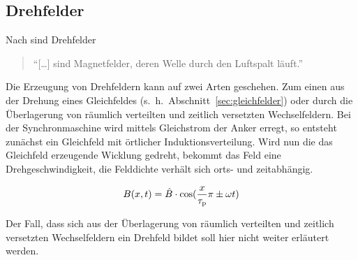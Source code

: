 \subsection{Drehfelder}\label{sec:drehfelder}

Nach \textcite{hofmann2013} sind Drehfelder

\begin{quote}
\enquote{[\ldots] sind Magnetfelder, deren Welle durch den Luftspalt läuft.}
\end{quote}

Die Erzeugung von Drehfeldern kann auf zwei Arten geschehen.
Zum einen aus der Drehung eines Gleichfeldes (s.~h.~Abschnitt~\ref{sec:gleichfelder}) oder durch die Überlagerung von räumlich verteilten und zeitlich versetzten Wechselfeldern.
Bei der Synchronmaschine wird mittels Gleichstrom der Anker erregt, so entsteht zunächst ein Gleichfeld mit örtlicher Induktionsverteilung.
Wird nun die das Gleichfeld erzeugende Wicklung gedreht, bekommt das Feld eine Drehgeschwindigkeit, \dh die Felddichte verhält sich orts- und zeitabhängig.

\begin{align}
B(x,t) = \hat{B}\cdot\cos(\frac{x}{\tau_{\mathrm{p}}}\pi\pm\omega t)
\end{align}

Der Fall, dass sich aus der Überlagerung von räumlich verteilten und zeitlich versetzten Wechselfeldern ein Drehfeld bildet soll hier nicht weiter erläutert werden.




